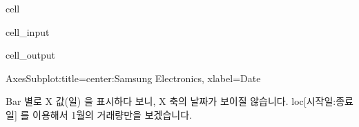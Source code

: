 \documentclass[letterpaper,10pt,english]{jupyterBook}
\begin{document}
\begin{sphinxuseclass}{cell}\begin{sphinxVerbatimInput}

\begin{sphinxuseclass}{cell_input}
\begin{sphinxVerbatim}[commandchars=\\\{\}]
\PYG{p}{[}\PYG{p}{]}    
\end{sphinxVerbatim}

\end{sphinxuseclass}\end{sphinxVerbatimInput}
\begin{sphinxVerbatimOutput}

\begin{sphinxuseclass}{cell_output}
\begin{sphinxVerbatim}[commandchars=\\\{\}]
\PYGZlt{}AxesSubplot:title=\PYGZob{}\PYGZsq{}center\PYGZsq{}:\PYGZsq{}Samsung Electronics\PYGZsq{}\PYGZcb{}, xlabel=\PYGZsq{}Date\PYGZsq{}\PYGZgt{}
\end{sphinxVerbatim}

\noindent{}

\end{sphinxuseclass}\end{sphinxVerbatimOutput}

\end{sphinxuseclass}
\sphinxAtStartPar
Bar 별로 X 값(일) 을 표시하다 보니, X 축의 날짜가 보이질 않습니다. loc{[}시작일:종료일{]} 를 이용해서 1월의 거래량만을 보겠습니다.
\end{document}
